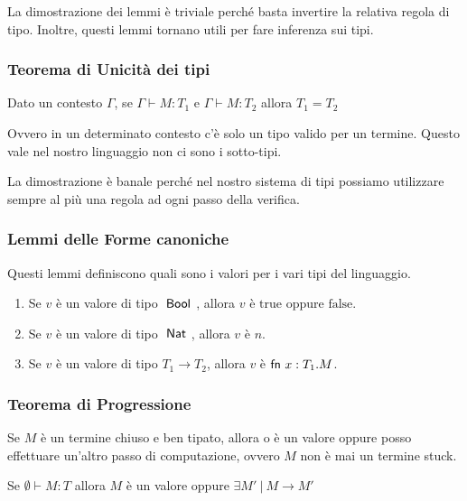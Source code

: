 \noindent La dimostrazione dei lemmi è triviale perché basta invertire la relativa regola di tipo. Inoltre, questi lemmi tornano utili per fare inferenza sui tipi.

\subsubsection{Teorema di Unicità dei tipi}

\begin{center}
	Dato un contesto $\Gamma$, se $\Gamma \vdash M : T_1 $ e $\Gamma \vdash M : T_2$ allora $T_1 = T_2$
\end{center}

\noindent Ovvero in un determinato contesto c'è solo un tipo valido per un termine. Questo vale nel nostro linguaggio non ci sono i sotto-tipi. 

La dimostrazione è banale perché nel nostro sistema di tipi possiamo utilizzare sempre al più una regola ad ogni passo della verifica.


\subsubsection{Lemmi delle Forme canoniche}

Questi lemmi definiscono quali sono i valori per i vari tipi del linguaggio.

\begin{enumerate}
	\item Se $v$ è un valore di tipo $\Bool$, allora $v$ è $\text{true}$ oppure $\text{false}$.
	\item Se $v$ è un valore di tipo $\Nat$, allora $v$ è $n$.
	\item Se $v$ è un valore di tipo $T_1 \rightarrow T_2$, allora $v$ è $\fn x : T_1 . M$.
\end{enumerate}

\subsubsection{Teorema di Progressione}

Se $M$ è un termine chiuso e ben tipato, allora o è un valore oppure posso effettuare un'altro passo di computazione, ovvero $M$ non è mai un termine stuck.

\begin{center}
Se $\emptyset \vdash M : T$ allora $M$ è un valore oppure $\exists M' \: | \: M \rightarrow M'$
\end{center}

